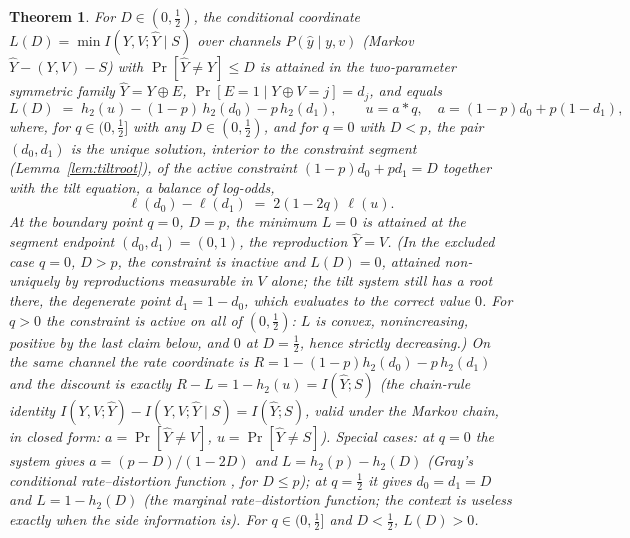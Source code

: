 \documentclass[11pt,onecolumn]{IEEEtran}
\newtheorem{theorem}{Theorem}
\newcommand{\hY}{\widehat{Y}}
\begin{document}
\begin{theorem}
\label{thm:binary}
For $D\in(0,\tfrac12)$, the conditional coordinate
$L(D)=\min I(Y,V;\hY\mid S)$ over channels $P(\hat y\mid y,v)$
(Markov $\hY-(Y,V)-S$) with $\Pr[\hY\ne Y]\le D$ is attained in
the two-parameter symmetric family $\hY=Y\oplus E$,
$\Pr[E=1\mid Y\oplus V=j]=d_j$, and equals
\[
L(D)\;=\;h_2(u)-(1-p)\,h_2(d_0)-p\,h_2(d_1),\qquad
u=a*q,\quad a=(1-p)d_0+p(1-d_1),
\]
where, for $q\in(0,\tfrac12]$ with any $D\in(0,\tfrac12)$, and for $q=0$
with $D<p$, the pair $(d_0,d_1)$ is the \emph{unique} solution, interior
to the constraint segment (Lemma~\ref{lem:tiltroot}), of the active
constraint $(1-p)d_0+pd_1=D$ together with the \emph{tilt equation}, a
balance of log-odds,
\[
\ell(d_0)-\ell(d_1)\;=\;2(1-2q)\,\ell(u).
\]
At the boundary point $q=0$, $D=p$, the minimum $L=0$ is attained at
the segment endpoint $(d_0,d_1)=(0,1)$, the reproduction
$\hY=V$.
(In the excluded case $q=0$, $D>p$, the constraint is inactive and
$L(D)=0$, attained non-uniquely by reproductions measurable in $V$ alone; the
tilt system still has a root there, the degenerate point $d_1=1-d_0$,
which evaluates to the correct value $0$. For $q>0$ the constraint is
active on all of $(0,\tfrac12)$: $L$ is convex, nonincreasing, positive
by the last claim below, and $0$ at $D=\tfrac12$, hence strictly
decreasing.)
On the same channel the rate coordinate is $R=1-(1-p)h_2(d_0)-p\,h_2(d_1)$
and the discount is exactly $R-L=1-h_2(u)=I(\hY;S)$ (the chain-rule
identity $I(Y,V;\hY)-I(Y,V;\hY\mid S)=I(\hY;S)$, valid under the
Markov chain, in closed form: $a=\Pr[\hY\ne V]$,
$u=\Pr[\hY\ne S]$). Special cases: at $q=0$ the system gives
$a=(p-D)/(1-2D)$ and $L=h_2(p)-h_2(D)$ (Gray's conditional
rate--distortion function \cite{gray1973}, for $D\le p$); at $q=\tfrac12$
it gives $d_0=d_1=D$ and $L=1-h_2(D)$ (the marginal rate--distortion
function; the context is useless exactly when the side information is).
For $q\in(0,\tfrac12]$ and $D<\tfrac12$, $L(D)>0$.
\end{theorem}
\end{document}
